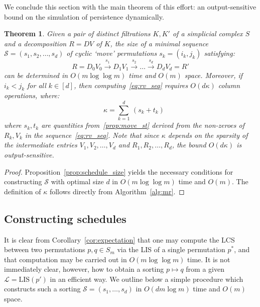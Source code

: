 \documentclass[sn-mathphys]{sn-jnl}
\newtheorem{theorem}{Theorem}
\begin{document}
We conclude this section with the main theorem of this effort: an output-sensitive bound on the simulation of persistence dynamically.
  \begin{theorem}\label{prop:sparsity_result}
   Given a pair of distinct filtrations $K, K'$ of a simplicial complex $S$ and a decomposition $R = DV$ of $K$, the size of a minimal sequence $\mathcal{S} = \left( s_1, s_2, \dots, s_d \right)$ of cyclic `move' permutations $s_k = (i_k, j_k)$ satisfying: 
   	\begin{equation}\label{eq:rv_seq}
   		R = D_0 V_0 \overset{s_1}{\to} D_1 V_{1} \overset{s_2}{\to} \dots \overset{s_d}{\to} D_d V_{d} = R'
   	\end{equation}
   	can be determined in $O(m \log \log m)$ time and $O(m)$ space. 
   	Moreover, if $i_k < j_k$ for all $k \in [d]$, then computing~\eqref{eq:rv_seq} requires $O(d\kappa)$ column operations, where:	  
   	$$  \quad \kappa = \sum\limits_{k = 1}^d \, (s_{k} + t_{k}) $$
	where $s_k, t_k$ are quantities from~\ref{prop:move_st} derived from the non-zeroes of $R_k, V_k$ in the sequence~\ref{eq:rv_seq}. Note that since $\kappa$ depends on the sparsity of the intermediate entries $V_1, V_2, \dots, V_d$ and $R_1, R_2, \dots, R_d$, the bound $O(d \kappa)$ is output-sensitive. 
\end{theorem}
\begin{proof} \normalsize
	Proposition~\ref{prop:schedule_size} yields the necessary conditions for constructing $\mathcal{S}$  with optimal size $d$ in $O(m \log \log m)$ time and $O(m)$. The definition of $\kappa$ follows directly from Algorithm~\ref{alg:mr}. 
\end{proof}

 
\subsection{Constructing schedules}\label{sec:schedule_construction}
It is clear from Corollary~\ref{cor:expectation} that one may compute the LCS between two permutations $p, q \in S_m$ via the LIS of a single permutation $p^\ast$, and that computation may be carried out in $O(m \log \log m)$ time. 
It is not immediately clear, however, how to obtain a sorting $p \mapsto q$ from a given $\mathcal{L} = \mathrm{LIS}(p')$ in an efficient way. We outline below a simple procedure which constructs such a sorting $\mathcal{S} = (s_1, \dots, s_d)$ in $O(dm\log m)$ time and $O(m)$ space. 
 
\end{document}
